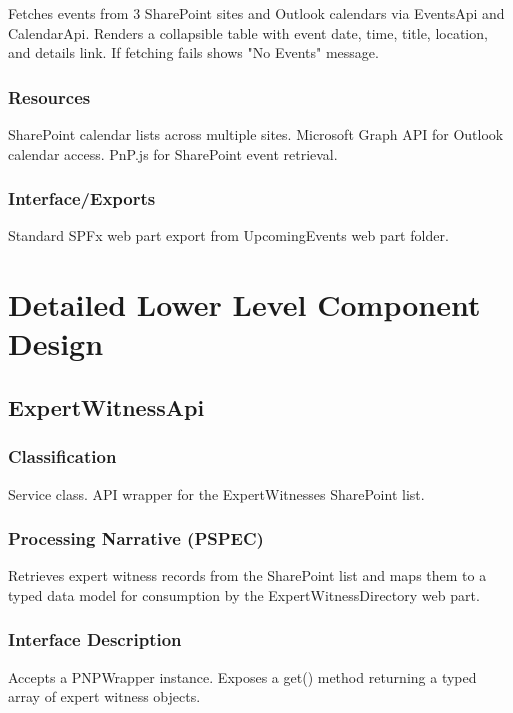 \documentclass[12pt]{article}
\begin{document}
Fetches events from 3 SharePoint sites and Outlook calendars via EventsApi and CalendarApi. Renders a collapsible table with event date, time, title, location, and details link. If fetching fails shows "No Events" message.

\subsubsection{Resources}

SharePoint calendar lists across multiple sites. Microsoft Graph API for Outlook calendar access. PnP.js for SharePoint event retrieval.

\subsubsection{Interface/Exports}

Standard SPFx web part export from UpcomingEvents web part folder.

\section{Detailed Lower Level Component Design}

\subsection{ExpertWitnessApi}

\subsubsection{Classification}

Service class. API wrapper for the ExpertWitnesses SharePoint list.

\subsubsection{Processing Narrative (PSPEC)}

Retrieves expert witness records from the SharePoint list and maps them to a typed data model for consumption by the ExpertWitnessDirectory web part.

\subsubsection{Interface Description}

Accepts a PNPWrapper instance. Exposes a get() method returning a typed array of expert witness objects.
\end{document}
